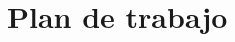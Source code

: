 \documentclass{article}
\begin{document}
\section{Plan de trabajo}



\newpage
























\end{document}
